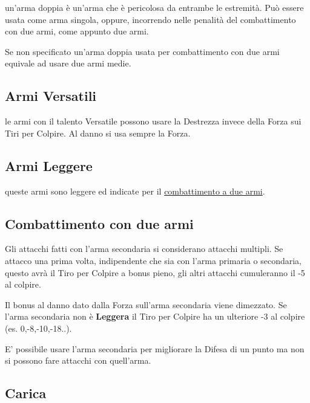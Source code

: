 \begin{multicols}{2}
un'arma doppia è un'arma che è pericolosa da entrambe le estremità. Può essere usata come arma singola, oppure, incorrendo nelle penalità del combattimento con due armi, come appunto due armi.

Se non specificato un'arma doppia usata per combattimento con due armi equivale ad usare due armi medie.

\subsection{Armi Versatili} \label{armiversatili}

le armi con il talento Versatile possono usare la Destrezza invece della Forza sui Tiri per Colpire. Al danno si usa sempre la Forza.

\subsection{Armi Leggere} \label{armileggere}

queste armi sono leggere ed indicate per il \hyperlink{combattimentoaduemani}{combattimento a due armi}.



\subsection{Combattimento con due armi}\hypertarget{combattimentoaduemani}{}\label{combattimentoduemani}

Gli attacchi fatti con l'arma secondaria si considerano attacchi multipli.
Se attacco una prima volta, indipendente che sia con l'arma primaria o secondaria, questo avrà il Tiro per Colpire a bonus pieno, gli altri attacchi cumuleranno il -5 al colpire.

Il bonus al danno dato dalla Forza sull'arma secondaria viene dimezzato. Se l'arma secondaria non è \textbf{Leggera} il Tiro per Colpire ha un ulteriore -3 al colpire (es. 0,-8,-10,-18..).

E' possibile usare l'arma secondaria per migliorare la Difesa di un punto ma non si possono fare attacchi con quell'arma.

\subsection{Carica} \label{carica}\hypertarget{carica}{}


\end{multicols}
